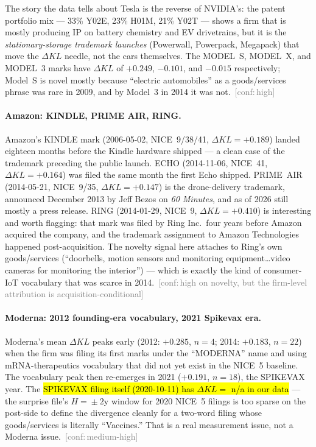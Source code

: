 \documentclass[11pt]{article}
\newcommand{\dKL}{\Delta KL}
\newcommand{\conf}[1]{\textcolor{gray}{\footnotesize\,[conf:\,#1]}}
\begin{document}
The story the data tells about Tesla is the reverse of NVIDIA's: the
patent portfolio mix --- 33\% Y02E, 23\% H01M, 21\% Y02T --- shows a
firm that is mostly producing IP on battery chemistry and EV
drivetrains, but it is the \emph{stationary-storage trademark
launches} (Powerwall, Powerpack, Megapack) that move the $\dKL$
needle, not the cars themselves. The MODEL~S, MODEL~X, and MODEL~3
marks have $\dKL$ of $+0.249$, $-0.101$, and $-0.015$ respectively;
Model~S is novel mostly because ``electric automobiles'' as a
goods/services phrase was rare in 2009, and by Model~3 in 2014 it
was not. \conf{high}

\paragraph{Amazon: KINDLE, PRIME AIR, RING.}
Amazon's KINDLE mark (2006-05-02, NICE~9/38/41, $\dKL = +0.189$)
landed eighteen months before the Kindle hardware shipped --- a clean
case of the trademark preceding the public launch. ECHO (2014-11-06,
NICE~41, $\dKL = +0.164$) was filed the same month the first Echo
shipped. PRIME~AIR (2014-05-21, NICE~9/35, $\dKL = +0.147$) is the
drone-delivery trademark, announced December 2013 by Jeff Bezos on
\emph{60 Minutes}, and as of 2026 still mostly a press release.
RING (2014-01-29, NICE~9, $\dKL = +0.410$) is interesting and worth
flagging: that mark was filed by Ring Inc.\ four years before Amazon
acquired the company, and the trademark assignment to Amazon
Technologies happened post-acquisition. The novelty signal here
attaches to Ring's own goods/services (``doorbells, motion sensors
and monitoring equipment\ldots video cameras for monitoring the
interior'') --- which is exactly the kind of consumer-IoT vocabulary
that was scarce in 2014. \conf{high on novelty, but the firm-level
attribution is acquisition-conditional}

\paragraph{Moderna: 2012 founding-era vocabulary, 2021 Spikevax era.}
Moderna's mean $\dKL$ peaks early (2012: $+0.285$, $n=4$; 2014:
$+0.183$, $n=22$) when the firm was filing its first marks under the
``MODERNA'' name and using mRNA-therapeutics vocabulary that did not
yet exist in the NICE~5 baseline. The vocabulary peak then re-emerges
in 2021 ($+0.191$, $n=18$), the SPIKEVAX year. The
\hl{SPIKEVAX filing itself (2020-10-11) has $\dKL =$ n/a in our data}
--- the surprise file's $H=\!\pm 2$y window for 2020 NICE~5 filings is
too sparse on the post-side to define the divergence cleanly for a
two-word filing whose goods/services is literally ``Vaccines.'' That
is a real measurement issue, not a Moderna issue. \conf{medium-high}
\end{document}
